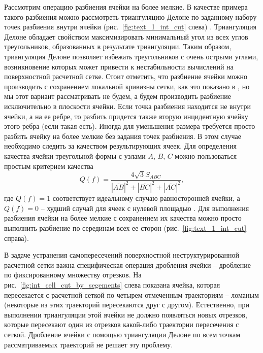 Рассмотрим операцию разбиения ячейки на более мелкие.
В качестве примера такого разбиения можно рассмотреть триангуляцию Делоне по заданному набору точек разбиения внутри ячейки (рис.~\ref{fig:text_1_int_cut} слева) \cite{Rivara2019Delaunay}.
Триангуляция Делоне обладает свойством максимизировать минимальный угол из всех углов треугольников, образованных в результате триангуляции.
Таким образом, триангуляция Делоне позволяет избежать треугольников с очень острыми углами, возникновение которых может привести к нестабильности вычислений на поверхностной расчетной сетке.
Стоит отметить, что разбиение ячейки можно производить с сохранением локальной кривизны сетки, как это показано в \cite{Rakotoarivelo2019Remesh}, но мы этот вариант рассматривать не будем, а будем производить разбиение исключительно в плоскости ячейки.
Если точка разбиения находится не внутри ячейки, а на ее ребре, то разбить придется также вторую инцидентную ячейку этого ребра (если такая есть).
Иногда для уменьшения размера требуется просто разбить ячейку на более мелкие без задания точек разбиения.
В этом случае необходимо следить за качеством результирующих ячеек.
Для определения качества ячейки треугольной формы с узлами $A$, $B$, $C$ можно пользоваться простым критерием качества
\begin{equation}
Q(f) = \frac{4\sqrt{3} S_{ABC}}{|\overline{AB}|^2 + |\overline{BC}|^2 + |\overline{AC}|^2},
\end{equation}
где $Q(f) = 1$ соответствует идеальному случаю равносторонней ячейки, а $Q(f) = 0$ -- худший случай для ячеек с нулевой площадью \cite{Borouchaki2000Remesh}.
Для выполнения разбиения ячейки на более мелкие с сохранением их качества можно просто выполнить разбиение по серединам всех ее сторон (рис.~\ref{fig:text_1_int_cut} справа).

В задаче устранения самопересечений поверхностной неструктурированной расчетной сетки важна специфическая операция дробления ячейки -- дробление по фиксированному множеству отрезков.
На рис.~\ref{fig:int_cell_cut_by_segements} слева показана ячейка, которая пересекается с расчетной сеткой по четырем отмеченным траекториям -- ломаным (некоторые из этих траекторий пересекаются друг с другом).
Естественно, при выполнении триангуляции этой ячейки не должно появляться новых отрезков, которые пересекают один из отрезков какой-либо траектории пересечения с сеткой.
Дробление ячейки с помощью триангуляции Делоне по всем точкам рассматриваемых траекторий не решает эту проблему.

